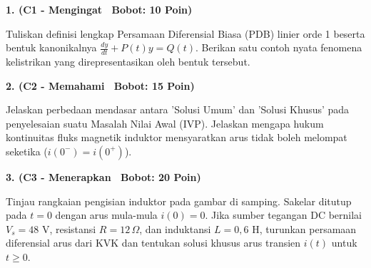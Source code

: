 \documentclass[10pt,a4paper]{article}
\begin{document}
\par
\vspace{1mm}

\noindent\textbf{1. (C1 - Mengingat \textbar\ Bobot: 10 Poin)}\par\vspace{0.8mm}
{\footnotesize Tuliskan definisi lengkap Persamaan Diferensial Biasa (PDB) linier orde 1 beserta bentuk kanonikalnya $\frac{dy}{dt} + P(t)y = Q(t)$. Berikan satu contoh nyata fenomena kelistrikan yang direpresentasikan oleh bentuk tersebut.}\par

\vspace{2.5mm}

\noindent\textbf{2. (C2 - Memahami \textbar\ Bobot: 15 Poin)}\par\vspace{0.8mm}
{\footnotesize Jelaskan perbedaan mendasar antara 'Solusi Umum' dan 'Solusi Khusus' pada penyelesaian suatu Masalah Nilai Awal (IVP). Jelaskan mengapa hukum kontinuitas fluks magnetik induktor mensyaratkan arus tidak boleh melompat seketika ($i(0^-) = i(0^+)$).}\par

\vspace{2.5mm}

\noindent\textbf{3. (C3 - Menerapkan \textbar\ Bobot: 20 Poin)}\par\vspace{0.8mm}
\noindent\begin{minipage}[t]{0.60\textwidth}%
  {\footnotesize Tinjau rangkaian pengisian induktor pada gambar di samping. Sakelar ditutup pada $t=0$ dengan arus mula-mula $i(0) = 0$. Jika sumber tegangan DC bernilai $V_s = 48\text{ V}$, resistansi $R = 12\,\Omega$, dan induktansi $L = 0{,}6\text{ H}$, turunkan persamaan diferensial arus dari KVK dan tentukan solusi khusus arus transien $i(t)$ untuk $t \ge 0$.}%
\end{minipage}%
\hfill%
\begin{minipage}[t]{0.37\textwidth}%
  \centering
\end{minipage}\par
\end{document}
